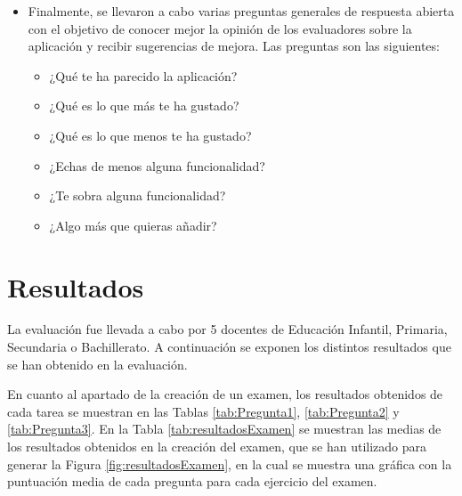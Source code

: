 \begin{itemize}
\begin{itemize}
          \end{itemize}
    \item Finalmente, se llevaron a cabo varias preguntas generales de respuesta abierta con el objetivo de conocer mejor la opinión de los evaluadores sobre la aplicación y recibir sugerencias de mejora. Las preguntas son las siguientes:
          \begin{itemize}
              \item ¿Qué te ha parecido la aplicación?
              \item ¿Qué es lo que más te ha gustado?
              \item ¿Qué es lo que menos te ha gustado?
              \item ¿Echas de menos alguna funcionalidad?
              \item ¿Te sobra alguna funcionalidad?
              \item ¿Algo más que quieras añadir?
          \end{itemize}
\end{itemize}

\section{Resultados}\label{sec:resultadosEvaluacion}
La evaluación fue llevada a cabo por 5 docentes de Educación Infantil, Primaria, Secundaria o Bachillerato. A continuación se exponen los distintos resultados que se han obtenido en la evaluación.

En cuanto al apartado de la creación de un examen, los resultados obtenidos de cada tarea se muestran en las Tablas \ref{tab:Pregunta1}, \ref{tab:Pregunta2} y \ref{tab:Pregunta3}. En la Tabla \ref{tab:resultadosExamen} se muestran las medias de los resultados obtenidos en la creación del examen, que se han utilizado para generar la Figura \ref{fig:resultadosExamen}, en la cual se muestra una gráfica con la puntuación media de cada pregunta para cada ejercicio del examen.

